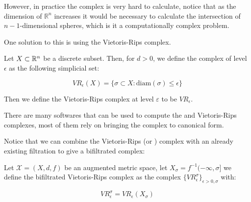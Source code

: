 %
%

However, in practice the {\Cech} complex is very hard to calculate,
notice that as the dimension of $\mathbb{R}^n$ increases it would be necessary
to calculate the intersection of $n-1$-dimensional spheres, which is it a
computationally complex problem.

One solution to this is using the 
Vietoris-Rips complex.



\begin{definition}
Let $X\subset \mathbb{R}^n$ be a discrete subset. Then, for $d>0$, we define the \Cech
complex of level $\epsilon$ as the following simplicial set:

$$
VR_\epsilon(X)
=
\{
\sigma \subset X :
\text{diam}(\sigma)\leq \epsilon
\}
$$

\end{definition}

Then we define the Vietoris-Rips complex at level $\varepsilon$ to be 
$VR_\epsilon$.



%

There are many softwares that can be used to compute the
{\Cech} and Vietoris-Rips complexes, most of them rely on bringing the complex to canonical form.


Notice that we can combine the Vietoris-Rips (or {\Cech}) complex 
with an already existing filtration to give a bifiltrated complex:

\begin{definition}

Let $\mathcal{X}=(X,d,f)$ be an augmented metric space,
let $X_\sigma=f^{-1}(-\infty,\sigma]$ we define the bifiltrated
Vietoris-Rips complex as the complex
$\{{VR}_\epsilon^\sigma\}_{\epsilon>0,\sigma}$
with:

$$
{VR}_\epsilon^\sigma=
{VR}_\epsilon(X_\sigma)
$$

\end{definition}

